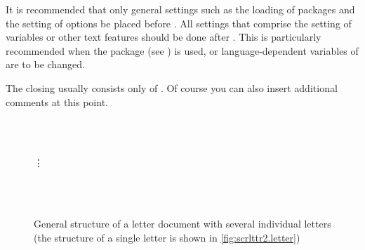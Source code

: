 It is recommended that only general settings such as the loading of packages
and the setting of options be placed before
. All settings that comprise the setting of
variables or other text features should be done after
. This is particularly recommended when the
 package (see \cite{package:babel}) is
used, or language-dependent variables of  are to be changed.

The closing usually consists only of
. Of course you can also insert
additional comments at this point.

\begin{figure}
\centering\small\setlength{\fboxsep}{1.5ex}
\\
\\
\parbox{.667\linewidth}{\raggedright\vspace{-.5ex}\vdots\vspace{1ex}}\\
\\
\caption{General structure of a letter document with several
individual letters (the structure of a single letter is shown in
 \autoref{fig:scrlttr2.letter})}
\label{fig:scrlttr2.document}
\vspace{2\abovecaptionskip}
\end{figure}
